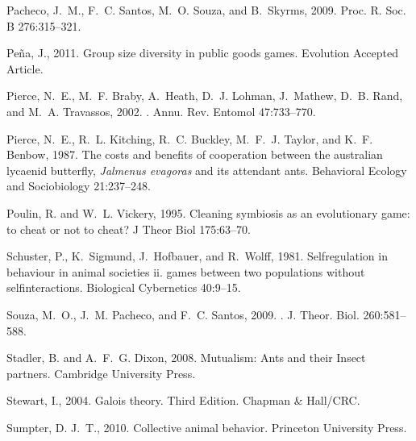 \documentclass[a4paper]{scrartcl}
\begin{document}
\begin{thebibliography}{58}
Pacheco, J.~M., F.~C. Santos, M.~O. Souza, and B.~Skyrms, 2009.
\newblock Proc. R. Soc. B 276:315--321.

Pe{\~n}a, J., 2011.
\newblock Group size diversity in public goods games.
\newblock Evolution Accepted Article.

Pierce, N.~E., M.~F. Braby, A.~Heath, D.~J. Lohman, J.~Mathew, D.~B. Rand, and
  M.~A. Travassos, 2002.
.
\newblock Annu. Rev. Entomol 47:733--770.

Pierce, N.~E., R.~L. Kitching, R.~C. Buckley, M.~F.~J. Taylor, and K.~F.
  Benbow, 1987.
\newblock The costs and benefits of cooperation between the australian lycaenid
  butterfly, \textit{Jalmenus evagoras} and its attendant ants.
\newblock Behavioral Ecology and Sociobiology 21:237--248.

Poulin, R. and W.~L. Vickery, 1995.
\newblock Cleaning symbiosis as an evolutionary game: to cheat or not to cheat?
\newblock J Theor Biol 175:63--70.

Schuster, P., K.~Sigmund, J.~Hofbauer, and R.~Wolff, 1981.
\newblock Selfregulation in behaviour in animal societies ii. games between two
  populations without selfinteractions.
\newblock Biological Cybernetics 40:9--15.

Souza, M.~O., J.~M. Pacheco, and F.~C. Santos, 2009.
.
\newblock J. Theor. Biol. 260:581--588.

Stadler, B. and A.~F.~G. Dixon, 2008.
\newblock Mutualism: Ants and their Insect partners.
\newblock Cambridge University Press.

Stewart, I., 2004.
\newblock Galois theory. Third Edition.
\newblock Chapman \& Hall/CRC.

Sumpter, D. J.~T., 2010.
\newblock Collective animal behavior.
\newblock Princeton University Press.


\end{thebibliography}
\end{document}
